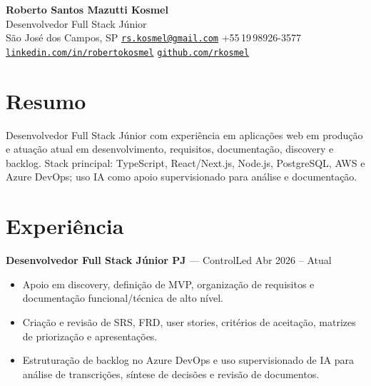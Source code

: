 \documentclass[a4paper,10pt]{article}
\begin{document}

\begin{center}
    {\Huge \textbf{Roberto Santos Mazutti Kosmel}} \\
    \vspace{1mm}
    {\large Desenvolvedor Full Stack Júnior} \\
    \vspace{1mm}
    São José dos Campos, SP \textbar{} \href{mailto:rs.kosmel@gmail.com}{\texttt{rs.kosmel@gmail.com}} \textbar{} +55\,19\,98926-3577 \\
    \href{https://www.linkedin.com/in/robertokosmel/}{\texttt{linkedin.com/in/robertokosmel}} \textbar{} \href{https://github.com/rkosmel}{\texttt{github.com/rkosmel}}
\end{center}

\vspace{1.5mm}

\section*{Resumo}
Desenvolvedor Full Stack Júnior com experiência em aplicações web em produção e atuação atual em desenvolvimento, requisitos, documentação, discovery e backlog. Stack principal: TypeScript, React/Next.js, Node.js, PostgreSQL, AWS e Azure DevOps; uso IA como apoio supervisionado para análise e documentação.

\section*{Experiência}
\textbf{Desenvolvedor Full Stack Júnior PJ} --- ControlLed \hfill Abr 2026 -- Atual \\
\begin{itemize}
    \item Apoio em discovery, definição de MVP, organização de requisitos e documentação funcional/técnica de alto nível.
    \item Criação e revisão de SRS, FRD, user stories, critérios de aceitação, matrizes de priorização e apresentações.
    \item Estruturação de backlog no Azure DevOps e uso supervisionado de IA para análise de transcrições, síntese de decisões e revisão de documentos.
\end{itemize}

\vspace{1mm}
\end{document}

